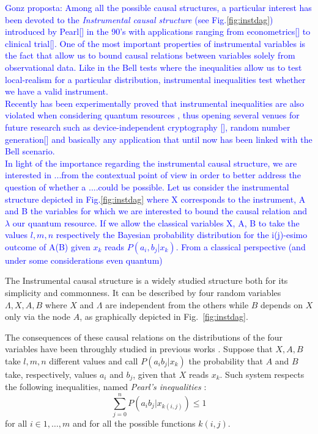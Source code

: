 \documentclass[
    nofootinbin,
    floatfix,
    amsfonts,
    twocolumn, 
    aps, 
    prl]{revtex4-1}
\begin{document}
\textcolor{blue}{Gonz proposta: Among all the possible causal structures, a particular interest has been devoted to the \textit{Instrumental causal structure} (see Fig.\ref{fig:instdag}) introduced by Pearl[] in the 90's with applications ranging from econometrics[] to clinical trial[]. One of the most important properties of instrumental variables is the fact that allow us to bound causal relations between variables solely from observational data. Like in the Bell tests where the inequalities allow us to test local-realism for a particular distribution, instrumental inequalities test whether we have a valid instrument.}\\
\textcolor{blue}{Recently has been experimentally proved that instrumental inequalities are also violated when considering quantum resources \cite{chaves2018}, thus opening several venues for future research such as device-independent cryptography [], random number generation[] and basically any application that until now has been linked with the Bell scenario.}\\

\textcolor{blue}{In light of the importance regarding the instrumental causal structure, we are interested in ...from the contextual point of view in order to better address the question of whether a ....could be possible.
Let us consider the instrumental structure depicted in Fig.\ref{fig:instdag} where X corresponds to the instrument, A and B the variables for which we are interested to bound the causal relation and $\lambda$ our quantum resource. If we allow the classical variables X, A, B to take the values $l,m,n$ respectively the Bayesian probability distribution for the i(j)-esimo outcome of A(B) given $x_k$ reads $P(a_i,b_j|x_k)$. From a classical perspective (and under some considerations even quantum)}


The Instrumental causal structure is a widely studied
structure both for its simplicity and commonness.
It can be described by four random variables $\Lambda, X, A, B$ where $X$ and
$\Lambda$ are independent from the others while $B$ depends on $X$ only via the node $A$,
as graphically depicted in Fig.~\ref{fig:instdag}.

The consequences of these causal relations on the distributions of the four
variables have been throughly studied in previous works \cite{pearl1995,
bonet2001}.
Suppose that $X, A, B$ take $l,m,n$ different values and 
call $P(a_i b_j | x_k)$ the probability that $A$ and $B$ take, respectively, values $a_i$
and $b_j$, given that $X$ reads $x_k$.
Such system respects the following inequalities,
named \emph{Pearl's inequalities} \cite{pearl1995}:
\begin{equation} 
    \sum_{j=0}^{n} P(a_i b_j|x_{k(i,j)}) \le 1
    \label{eq:pearl_ineq}
\end{equation}
for all $i \in {1,\ldots, m}$ and for all the possible functions $k(i,j)$.
\end{document}
